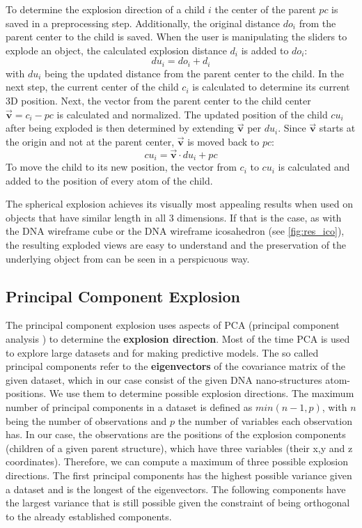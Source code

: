 \documentclass[draft,final]{vutinfth} %
\begin{document}
\par To determine the explosion direction of a child $i$ the center of the parent $pc$ is saved in a preprocessing step. Additionally, the original distance $do_i$ from the parent center to the child is saved. When the user is manipulating the sliders to explode an object, the calculated explosion distance $d_i$ is added to $do_i$:
\begin{equation}
\label{eq:du}
du_i = do_i + d_i
\end{equation}
with $du_i$ being the updated distance from the parent center to the child. In the next step, the current center of the child $c_i$ is calculated to determine its current 3D position. Next, the vector from the parent center to the child center $\bm{\vec{v}} = c_i - pc$ is calculated and normalized. The updated position of the child $cu_i$ after being exploded is then determined by extending $\bm{\vec{v}}$ per $du_i$. Since $\bm{\vec{v}}$ starts at the origin and not at the parent center, $\bm{\vec{v}}$ is moved back to $pc$:
\begin{equation}
\label{eq:cuSphere}
cu_i = \bm{\vec{v}} \cdot du_i + pc
\end{equation}
To move the child to its new position, the vector from $c_i$ to $cu_i$ is calculated and added to the position of every atom of the child. 

\par The spherical explosion achieves its visually most appealing results when used on objects that have similar length in all 3 dimensions. If that is the case, as with the DNA wireframe cube or the DNA wireframe icosahedron (see \autoref{fig:res_ico}), the resulting exploded views are easy to understand and the preservation of the underlying object from can be seen in a perspicuous way.


\subsection{Principal Component Explosion}
\label{subsec:methodPCA}
The principal component explosion uses aspects of PCA (principal component analysis \cite{jolliffe2011principal}) to determine the \textbf{explosion direction}. Most of the time PCA is used to explore large datasets and for making predictive models. The so called principal components refer to the \textbf{eigenvectors} of the covariance matrix of the given dataset, which in our case consist of the given DNA nano-structures atom-positions. We use them to determine possible explosion directions. The maximum number of principal components in a dataset is defined as $min(n-1,p)$, with $n$ being the number of observations and $p$ the number of variables each observation has. In our case, the observations are the positions of the explosion components (children of a given parent structure), which have three variables (their x,y and z coordinates). Therefore, we can compute a maximum of three possible explosion directions. The first principal components has the highest possible variance given a dataset and is the longest of the eigenvectors. The following components have the largest variance that is still possible given the constraint of being orthogonal to the already established components.
\end{document}

